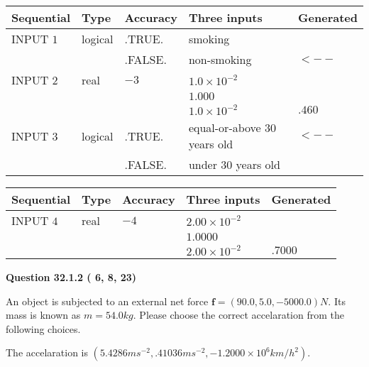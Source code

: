 \documentclass[12pt]{article}
\begin{document}
   
  
  
\noindent\begin{tabular}{|l|l|l|l|l|}
\hline
 Sequential & Type & Accuracy & Three inputs & Generated \\ 
\hline
 
 
  INPUT $           1$ & logical & .TRUE. & 
 smoking & 
  \\
  & & .FALSE. & 
  non-smoking & 
  $ <-- $ 
 \\  \hline  
 
 
  INPUT $           2$ & real & $          -3 $ & $
 1.0 \times 10^{-2}
  $ & \\
  & & &  $
 1.000
  $ & \\
  & & &  $
 1.0 \times 10^{-2}
 $ & $ .460 $ 
 \\  \hline  
 
 
  INPUT $           3$ & logical & .TRUE. & 
 equal-or-above 30 years old & 
  $ <-- $ 
  \\
  & & .FALSE. & 
  under 30 years old & 
 \\  \hline  
 \end{tabular}
   
   
  
  
\noindent\begin{tabular}{|l|l|l|l|l|}
\hline
 Sequential & Type & Accuracy & Three inputs & Generated \\ 
\hline
 
 
  INPUT $           4$ & real & $          -4 $ & $
 2.00 \times 10^{-2}
  $ & \\
  & & &  $
 1.0000
  $ & \\
  & & &  $
 2.00 \times 10^{-2}
 $ & $ .7000 $ 
 \\  \hline  
 \end{tabular}
   
   
  
\vspace{0.2in}
  
{\textbf{\Large{Question
32.1.2 
 (          6,          8,         23)
}}}
  
  
 
An object is subjected to an external net force $\mathbf{f}=(
90.0 ,
5.0,
-5000.0  )N$. Its mass is known as
$m= %
54.0  kg$. Please choose the correct accelaration
from the following choices.
 
 
 
The accelaration is
$(
5.4286ms^{-2},
.41036ms^{-2},
-1.2000 \times 10^{6}km/h^2
).
$
 
\end{document}
